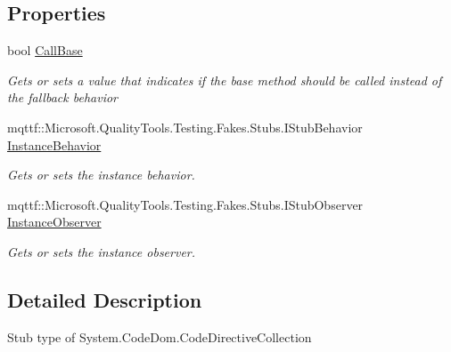 \subsection*{Properties}
\begin{DoxyCompactItemize}
\item 
bool \hyperlink{class_system_1_1_code_dom_1_1_fakes_1_1_stub_code_directive_collection_ac2b670223a8e17aaf37b6a6f27c92bf5}{Call\-Base}
\begin{DoxyCompactList}\small\item\em Gets or sets a value that indicates if the base method should be called instead of the fallback behavior\end{DoxyCompactList}\item 
mqttf\-::\-Microsoft.\-Quality\-Tools.\-Testing.\-Fakes.\-Stubs.\-I\-Stub\-Behavior \hyperlink{class_system_1_1_code_dom_1_1_fakes_1_1_stub_code_directive_collection_a79686d9475323862e258c180c1ccbbbd}{Instance\-Behavior}
\begin{DoxyCompactList}\small\item\em Gets or sets the instance behavior.\end{DoxyCompactList}\item 
mqttf\-::\-Microsoft.\-Quality\-Tools.\-Testing.\-Fakes.\-Stubs.\-I\-Stub\-Observer \hyperlink{class_system_1_1_code_dom_1_1_fakes_1_1_stub_code_directive_collection_abfe2f3215620240509c31c9f3520b5be}{Instance\-Observer}
\begin{DoxyCompactList}\small\item\em Gets or sets the instance observer.\end{DoxyCompactList}\end{DoxyCompactItemize}


\subsection{Detailed Description}
Stub type of System.\-Code\-Dom.\-Code\-Directive\-Collection



